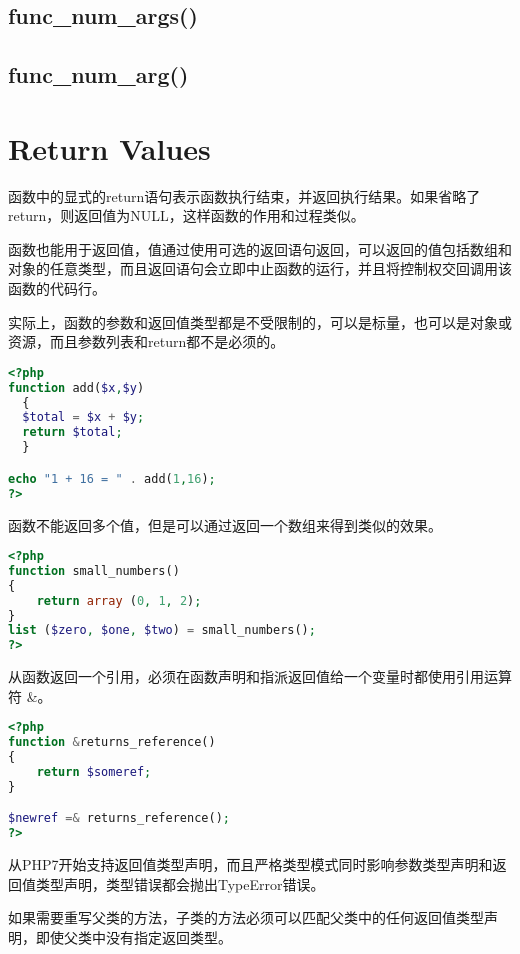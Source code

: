 \subsection{func\_num\_args()}


\subsection{func\_num\_arg()}



\section{Return Values}



函数中的显式的return语句表示函数执行结束，并返回执行结果。如果省略了return，则返回值为NULL，这样函数的作用和过程类似。

函数也能用于返回值，值通过使用可选的返回语句返回，可以返回的值包括数组和对象的任意类型，而且返回语句会立即中止函数的运行，并且将控制权交回调用该函数的代码行。

实际上，函数的参数和返回值类型都是不受限制的，可以是标量，也可以是对象或资源，而且参数列表和return都不是必须的。

\begin{lstlisting}[language=PHP]
<?php
function add($x,$y)
  {
  $total = $x + $y;
  return $total;
  }

echo "1 + 16 = " . add(1,16);
?>
\end{lstlisting}


函数不能返回多个值，但是可以通过返回一个数组来得到类似的效果。

\begin{lstlisting}[language=PHP]
<?php
function small_numbers()
{
    return array (0, 1, 2);
}
list ($zero, $one, $two) = small_numbers();
?>
\end{lstlisting}

从函数返回一个引用，必须在函数声明和指派返回值给一个变量时都使用引用运算符 \&。

\begin{lstlisting}[language=PHP]
<?php
function &returns_reference()
{
    return $someref;
}

$newref =& returns_reference();
?>
\end{lstlisting}

从PHP7开始支持返回值类型声明，而且严格类型模式同时影响参数类型声明和返回值类型声明，类型错误都会抛出TypeError错误。

如果需要重写父类的方法，子类的方法必须可以匹配父类中的任何返回值类型声明，即使父类中没有指定返回类型。

